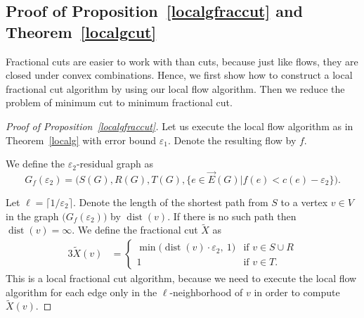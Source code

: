 \documentclass[12pt,a4paper]{article}
\newcommand{\dist}{\operatorname{dist}}
\newcommand{\eps}{\varepsilon}
\newcommand{\EG}{\vec{E}(G)}
\renewcommand{\:}{\colon}
\begin{document}
\subsection{Proof of Proposition~\ref{localgfraccut} and Theorem~\ref{localgcut}}\label{subsec:fraccut}

Fractional cuts are easier to work with than cuts, because just like flows, they are closed under convex combinations. 
Hence, we first show how to construct a local fractional cut algorithm by using our local flow algorithm. 
Then we reduce the problem of minimum cut to minimum fractional cut. 

\begin{proof}[Proof of Proposition~\ref{localgfraccut}]
Let us execute the local flow algorithm as in Theorem~\ref{localg} with error bound $\eps_1$. Denote the resulting flow by $f$.

We define the $\eps_2$-residual graph as
\begin{equation} \label{Gfdef}
G_f(\eps_2) = \Big(S(G), R(G), T(G), \big\{e \in \EG \big| f(e) < c(e) - \eps_2 \big\}\Big).
\end{equation}

Let $\ell = \lceil 1 / \eps_2 \rceil$. 
Denote the length of the shortest path from $S$ to a vertex $v \in V$ in the graph $\big(G_f(\eps_2)\big)$ by $\dist(v)$. 
If there is no such path then $\dist(v) = \infty$. 
We define the fractional cut $\tilde{X}$ as
\begin{alignat}{3} \label{fracconstr}
   \tilde{X}(v) &=
\begin{cases}
\min\big( \dist(v) \cdot \eps_2,\ 1 \big) & \text{if } v \in S \cup R
\\ 1 & \text{if } v \in T.
\end{cases}
\end{alignat}
This is a local fractional cut algorithm, because we need to execute the local flow algorithm for each edge only in the $\ell$-neighborhood of $v$ in order to compute $\tilde{X}(v)$.


\end{proof}
\end{document}
